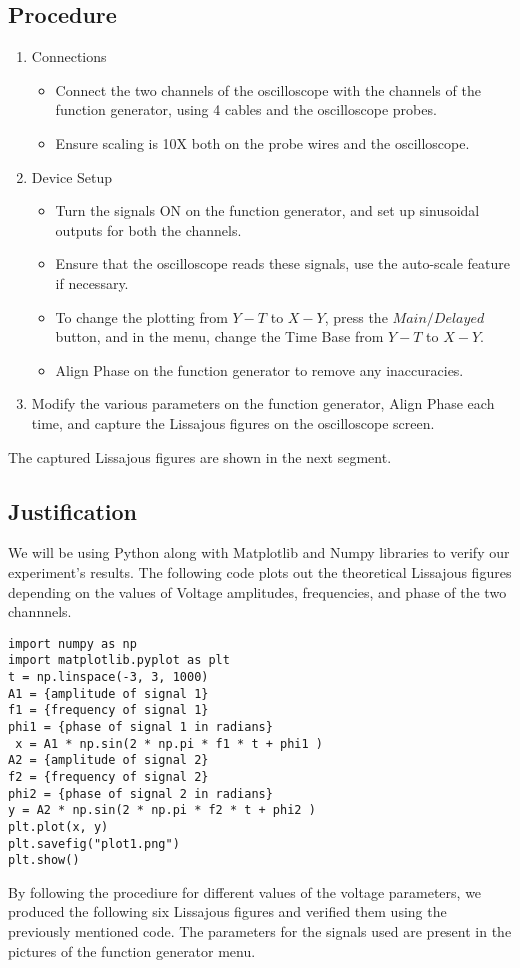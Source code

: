 \documentclass[a4paper,12pt]{article}
\begin{document}
\subsection{Procedure}
\begin{enumerate}
\item Connections
\begin{itemize}
\item Connect the two channels of the oscilloscope with the channels of the function generator, using 4 cables and the oscilloscope probes.
\item Ensure scaling is 10X both on the probe wires and the oscilloscope.
\end{itemize}
\item Device Setup
\begin{itemize}
\item Turn the signals ON on the function generator, and set up sinusoidal outputs for both the channels.
\item Ensure that the oscilloscope reads these signals, use the auto-scale feature if necessary.
\item To change the plotting from $Y-T$ to $X-Y$, press the $Main/Delayed$ button, and in the menu, change the Time Base from $Y-T$ to $X-Y$.
\item Align Phase on the function generator to remove any inaccuracies.
\end{itemize}
\item Modify the various parameters on the function generator, Align Phase each time, and capture the Lissajous figures on the oscilloscope screen.
\end{enumerate}
The captured Lissajous figures are shown in the next segment.
\subsection{Justification}
We will be using Python along with Matplotlib and Numpy libraries to verify our experiment's results. The following code plots out the theoretical Lissajous figures depending on the values of Voltage amplitudes, frequencies, and phase of the two channnels.
\begin{verbatim}
import numpy as np
import matplotlib.pyplot as plt
t = np.linspace(-3, 3, 1000)
A1 = {amplitude of signal 1}
f1 = {frequency of signal 1}
phi1 = {phase of signal 1 in radians}
 x = A1 * np.sin(2 * np.pi * f1 * t + phi1 )
A2 = {amplitude of signal 2}
f2 = {frequency of signal 2}
phi2 = {phase of signal 2 in radians}
y = A2 * np.sin(2 * np.pi * f2 * t + phi2 )
plt.plot(x, y)
plt.savefig("plot1.png")
plt.show()
\end{verbatim}
By following the procediure for different values of the voltage parameters, we produced the following six Lissajous figures and verified them using the previously mentioned code.
The parameters for the signals used are present in the pictures of the function generator menu.
\end{document}
